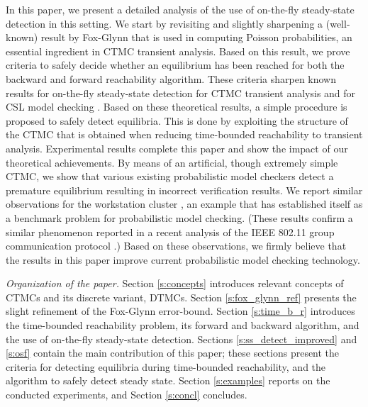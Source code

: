 \documentclass[times, 10pt,twocolumn]{article}
\begin{document}
In this paper, we present a detailed analysis of the use of on-the-fly steady-state detection in this
setting. 
We start by revisiting and slightly sharpening a (well-known) result by Fox-Glynn \cite{FoxG_ACM88} that is used in computing Poisson probabilities, an essential ingredient in CTMC transient analysis.
Based on this result, we prove criteria to safely decide whether an equilibrium has been reached 
for both the backward and forward reachability algorithm. 
These criteria sharpen known results for on-the-fly steady-state detection for CTMC transient 
analysis \cite{MalhotraMT_MR94} and for CSL model checking \cite{YounesKNP_TACAS04,%
YounesKNP_STTT05}.
Based on these theoretical results, a simple procedure is proposed to safely detect equilibria.
This is done by exploiting the structure of the CTMC that is obtained when reducing time-bounded reachability to transient analysis. 
Experimental results complete this paper and show the impact of our theoretical achievements. 
By means of an artificial, though extremely simple CTMC, we show that various existing
probabilistic model checkers detect a premature equilibrium resulting in incorrect verification
results.
We report similar observations for the workstation cluster \cite{HaverkortHK_SRDS00, BuchholzKKT_JLAP03, YounesKNP_TACAS04, KwiatkowskaNP_IMTTCPE02, Prism_WC05}, 
an example that has established itself as a benchmark problem for probabilistic model checking.
(These results confirm a similar phenomenon reported in a recent analysis of the IEEE 802.11 
group communication protocol \cite{MassinkKL_DSN04}.)
Based on these observations, we firmly believe that the results in this paper improve current
probabilistic model checking technology.

\emph{Organization of the paper.} 
Section \ref{s:concepts} introduces relevant concepts of CTMCs and its discrete variant, DTMCs. 
Section \ref{s:fox_glynn_ref} presents the slight refinement of the Fox-Glynn error-bound. 
Section \ref{s:time_b_r} introduces the time-bounded reachability problem, its forward and
backward algorithm, and the use of on-the-fly steady-state detection. 
Sections \ref{s:ss_detect_improved} and \ref{s:osf} contain the main contribution of this paper;
these sections present the criteria for detecting equilibria during time-bounded reachability,
and the algorithm to safely detect steady state.    
Section \ref{s:examples} reports on the conducted experiments, and Section \ref{s:concl} concludes.

\end{document}
